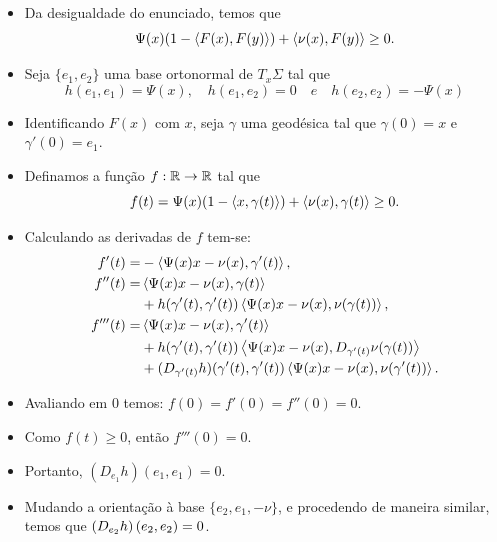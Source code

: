 \documentclass[12pt,a4paper]{beamer}
\theoremstyle{definition}
\begin{document}
\begin{frame}[allowframebreaks]
	\begin{itemize}
		\item Da desigualdade do enunciado, temos que
		\begin{equation*}
		\Psi(x) (1-\left\langle F(x),F(y) \right\rangle) + \left\langle \nu(x),F(y) \right\rangle \geq 0.
		\end{equation*}
		
		\item Seja $\{ e_1,e_2 \}$ uma base ortonormal de $T_x \Sigma$ tal que
		\begin{equation*}
		h(e_1,e_1)=\Psi(x), \quad h(e_1,e_2)=0 \quad e \quad h(e_2,e_2)=-\Psi(x)
		\end{equation*}
		
		\item Identificando $F(x)$ com $x$, seja $\gamma$ uma geodésica tal que $\gamma(0)=x$ e $\gamma'(0)=e_1$.
		
		\item Definamos a função $f: \mathbb R \rightarrow \mathbb R$ tal que
		\begin{equation*}
		f(t) = \Psi(x) (1-\left\langle x,\gamma(t) \right\rangle) + \left\langle \nu(x),\gamma(t) \right\rangle \geq 0.
		\end{equation*}

		\item Calculando as derivadas de $f$ tem-se:
		\begin{align*}
		f'(t) =& -\left\langle \Psi(x)x - \nu(x),\gamma'(t) \right\rangle,\\
		f''(t) =& \left\langle \Psi(x)x - \nu(x),\gamma(t) \right\rangle\\
		& + h(\gamma'(t),\gamma'(t)) \left\langle \Psi(x)x - \nu(x),\nu(\gamma(t)) \right\rangle,\\
		f'''(t) =& \left\langle \Psi(x)x - \nu(x),\gamma'(t) \right\rangle\\
		& + h(\gamma'(t),\gamma'(t)) \left\langle \Psi(x)x - \nu(x),D_{\gamma'(t)} \nu(\gamma(t)) \right\rangle\\
		& + (D_{\gamma'(t)} h) (\gamma'(t),\gamma'(t)) \left\langle \Psi(x)x - \nu(x),\nu(\gamma'(t)) \right\rangle.
		\end{align*}

		\item Avaliando em $0$ temos: $f(0)=f'(0)=f''(0)=0$.
		
		\item Como $f(t) \geq 0$, então $f'''(0)=0$.
		
		\item Portanto, $(D_{e_1}h)(e_1,e_1)=0$.
		
		\item Mudando a orientação à base $\{ e_2, e_1, -\nu \}$, e procedendo de maneira similar, temos que $\left( D_{e_2}h \right) \left( e_2,e_2 \right)=0$.
		

\end{itemize}
\end{frame}
\end{document}
